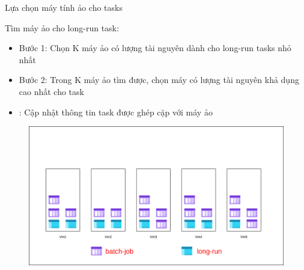 \documentclass[11pt,xcolor={dvipsnames}, aspectratio=169]{beamer}
\begin{document}
\begin{frame}
{Lựa chọn máy tính ảo cho tasks}

	\begin{minipage}[t]{0.4\linewidth}
		\vspace{0.5cm}
		Tìm máy ảo cho long-run task: 
		\begin{itemize}
			\item Bước 1: Chọn K máy ảo có lượng tài nguyên dành cho long-run tasks nhỏ nhất 
			\item Bước 2: Trong K máy ảo tìm được, chọn máy có lượng tài nguyên khả dụng cao nhất cho task 
			\item {\color{red}{Bước 3}}: Cập nhật thông tin task được ghép cặp với máy ảo
		\end{itemize}
	\end{minipage}
	\hfill
	\begin{minipage}[t]{0.59\linewidth}
	\begin{figure}
		\vspace{1cm}
		\includegraphics[scale=0.35]{images/balancing_tasks5.png}
	\end{figure}
	\vspace{1cm}
	\end{minipage}
\end{frame}
\end{document}
